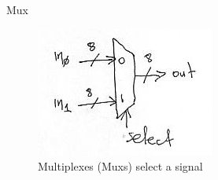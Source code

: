 \documentclass[../notes.tex]{subfiles}
\begin{document}
\begin{definition}
	Mux
	\begin{figure}[H]
		\centering
		\includegraphics[width=0.8\linewidth]{img/image_2022-12-10-15-38-14.png}
		\caption{Multiplexes (Muxs) select a signal}
	\end{figure}
\end{definition}
\end{document}
